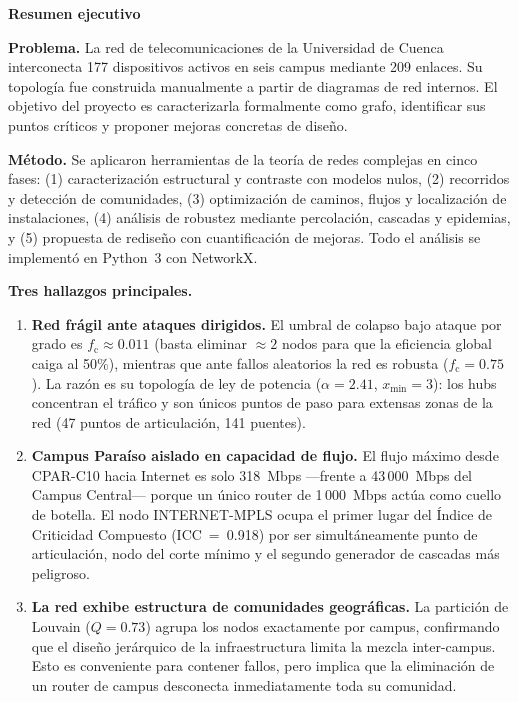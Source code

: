 \documentclass[12pt, a4paper]{article}
\newenvironment{resumen}{%
    \begin{mdframed}[backgroundcolor=grisfondo, linecolor=borde,
        linewidth=4pt, leftline=true, rightline=false,
        topline=false, bottomline=false,
        innerleftmargin=10pt, innerrightmargin=10pt,
        innertopmargin=8pt, innerbottommargin=8pt,
        leftmargin=0pt, rightmargin=0pt,
        skipabove=10pt, skipbelow=10pt]
    \small
}{\end{mdframed}}
\newcommand{\fc}{f_{\mathrm{c}}}
\begin{document}
\begin{center}
    {\large\bfseries\color{azulsec} Resumen ejecutivo}
\end{center}
\begin{resumen}
\textbf{Problema.} La red de telecomunicaciones de la Universidad de Cuenca
interconecta 177 dispositivos activos en seis campus mediante 209 enlaces. Su
topología fue construida manualmente a partir de diagramas de red internos.
El objetivo del proyecto es caracterizarla formalmente como grafo, identificar
sus puntos críticos y proponer mejoras concretas de diseño.

\medskip
\textbf{Método.} Se aplicaron herramientas de la teoría de redes complejas en
cinco fases: (1) caracterización estructural y contraste con modelos nulos,
(2) recorridos y detección de comunidades, (3) optimización de caminos, flujos
y localización de instalaciones, (4) análisis de robustez mediante percolación,
cascadas y epidemias, y (5) propuesta de rediseño con cuantificación de mejoras.
Todo el análisis se implementó en Python~3 con NetworkX.

\medskip
\textbf{Tres hallazgos principales.}
\begin{enumerate}
    \item \textbf{Red frágil ante ataques dirigidos.} El umbral de colapso bajo
    ataque por grado es $\fc \approx 0.011$ (basta eliminar $\approx 2$ nodos
    para que la eficiencia global caiga al 50\%), mientras que ante fallos
    aleatorios la red es robusta ($\fc = 0.75$). La razón es su topología de
    ley de potencia ($\alpha = 2.41$, $x_{\min}=3$): los hubs concentran el
    tráfico y son únicos puntos de paso para extensas zonas de la red (47
    puntos de articulación, 141 puentes).

    \item \textbf{Campus Paraíso aislado en capacidad de flujo.} El flujo
    máximo desde CPAR-C10 hacia Internet es solo 318~Mbps ---frente a
    43\,000~Mbps del Campus Central--- porque un único router de 1\,000~Mbps
    actúa como cuello de botella. El nodo INTERNET-MPLS ocupa el primer lugar
    del Índice de Criticidad Compuesto (ICC~=~0.918) por ser simultáneamente
    punto de articulación, nodo del corte mínimo y el segundo generador de
    cascadas más peligroso.

    \item \textbf{La red exhibe estructura de comunidades geográficas.} La
    partición de Louvain ($Q = 0.73$) agrupa los nodos exactamente por campus,
    confirmando que el diseño jerárquico de la infraestructura limita la
    mezcla inter-campus. Esto es conveniente para contener fallos, pero implica
    que la eliminación de un router de campus desconecta inmediatamente toda su
    comunidad.
\end{enumerate}


\end{resumen}
\end{document}
